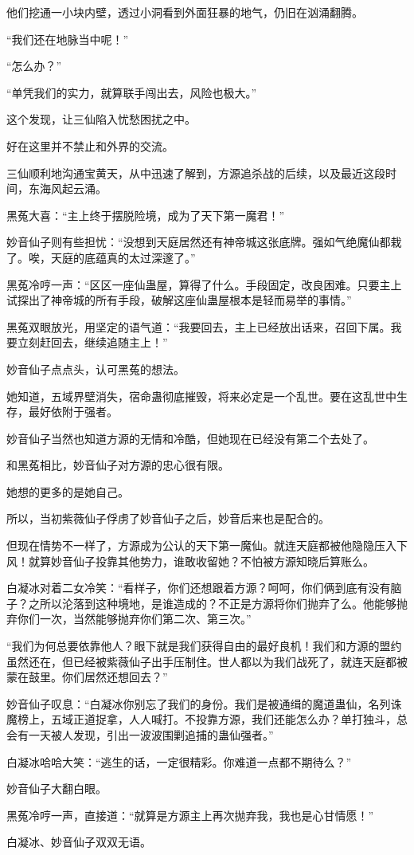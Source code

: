 \begin{this_body}
他们挖通一小块内壁，透过小洞看到外面狂暴的地气，仍旧在汹涌翻腾。

“我们还在地脉当中呢！”

“怎么办？”

“单凭我们的实力，就算联手闯出去，风险也极大。”

这个发现，让三仙陷入忧愁困扰之中。

好在这里并不禁止和外界的交流。

三仙顺利地沟通宝黄天，从中迅速了解到，方源追杀战的后续，以及最近这段时间，东海风起云涌。

黑菟大喜：“主上终于摆脱险境，成为了天下第一魔君！”

妙音仙子则有些担忧：“没想到天庭居然还有神帝城这张底牌。强如气绝魔仙都栽了。唉，天庭的底蕴真的太过深邃了。”

黑菟冷哼一声：“区区一座仙蛊屋，算得了什么。手段固定，改良困难。只要主上试探出了神帝城的所有手段，破解这座仙蛊屋根本是轻而易举的事情。”

黑菟双眼放光，用坚定的语气道：“我要回去，主上已经放出话来，召回下属。我要立刻赶回去，继续追随主上！”

妙音仙子点点头，认可黑菟的想法。

她知道，五域界壁消失，宿命蛊彻底摧毁，将来必定是一个乱世。要在这乱世中生存，最好依附于强者。

妙音仙子当然也知道方源的无情和冷酷，但她现在已经没有第二个去处了。

和黑菟相比，妙音仙子对方源的忠心很有限。

她想的更多的是她自己。

所以，当初紫薇仙子俘虏了妙音仙子之后，妙音后来也是配合的。

但现在情势不一样了，方源成为公认的天下第一魔仙。就连天庭都被他隐隐压入下风！就算妙音仙子投靠其他势力，谁敢收留她？不怕被方源知晓后算账么。

白凝冰对着二女冷笑：“看样子，你们还想跟着方源？呵呵，你们俩到底有没有脑子？之所以沦落到这种境地，是谁造成的？不正是方源将你们抛弃了么。他能够抛弃你们一次，当然能够抛弃你们第二次、第三次。”

“我们为何总要依靠他人？眼下就是我们获得自由的最好良机！我们和方源的盟约虽然还在，但已经被紫薇仙子出手压制住。世人都以为我们战死了，就连天庭都被蒙在鼓里。你们居然还想回去？”

妙音仙子叹息：“白凝冰你别忘了我们的身份。我们是被通缉的魔道蛊仙，名列诛魔榜上，五域正道捉拿，人人喊打。不投靠方源，我们还能怎么办？单打独斗，总会有一天被人发现，引出一波波围剿追捕的蛊仙强者。”

白凝冰哈哈大笑：“逃生的话，一定很精彩。你难道一点都不期待么？”

妙音仙子大翻白眼。

黑菟冷哼一声，直接道：“就算是方源主上再次抛弃我，我也是心甘情愿！”

白凝冰、妙音仙子双双无语。

\end{this_body}

